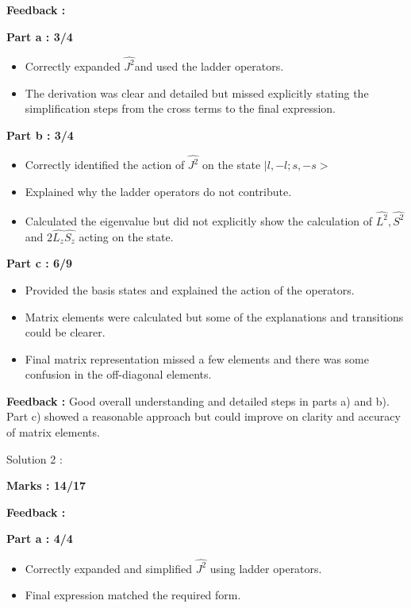 \documentclass[a4paper,11pt]{article}
\begin{document}
\textbf{Feedback : }

\textbf{Part a : 3/4}

\begin{itemize}
    \item Correctly expanded $\hat{J^2}$and used the ladder operators.
    \item The derivation was clear and detailed but missed explicitly stating the simplification steps from the cross terms to the final expression.
\end{itemize}


\textbf{Part b : 3/4}

\begin{itemize}
    \item Correctly identified the action of $\hat{J^2}$ on the state $|l, -l;s, -s>$
    \item Explained why the ladder operators do not contribute.
    \item Calculated the eigenvalue but did not explicitly show the calculation of $\hat{L^2}, \hat{S^2}$ and $2\hat{L_z}\hat{S_z}$ acting on the state.
\end{itemize}


\textbf{Part c : 6/9}

\begin{itemize}
    \item Provided the basis states and explained the action of the operators.
    \item Matrix elements were calculated but some of the explanations and transitions could be clearer.
    \item Final matrix representation missed a few elements and there was some confusion in the off-diagonal elements.
\end{itemize}

\textbf{Feedback :}
Good overall understanding and detailed steps in parts a) and b). Part c) showed a reasonable approach but could improve on clarity and accuracy of matrix elements.


Solution 2 :

\textbf{Marks : 14/17}

\textbf{Feedback : }

\textbf{Part a : 4/4}

\begin{itemize}
    \item Correctly expanded and simplified $\hat{J^2}$ using ladder operators.
    \item Final expression matched the required form.
\end{itemize}
\end{document}
